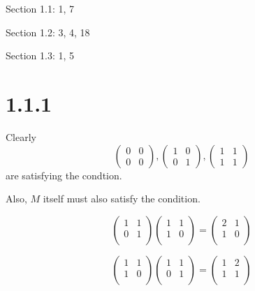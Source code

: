 \documentclass[11pt]{article}
\begin{document}


\begin{center}
\end{center}



Section 1.1: 1, 7

Section 1.2: 3, 4, 18

Section 1.3: 1, 5

\section*{1.1.1}

Clearly
$$
\begin{pmatrix} 
	0 & 0\\
	0 & 0 
\end{pmatrix},
\begin{pmatrix}
	1 & 0\\
	0 & 1
\end{pmatrix},
\begin{pmatrix}
	1 & 1\\
	1 & 1 
\end{pmatrix}  
$$
are satisfying the condtion.

Also, $M$ itself must also satisfy the condition.

$$
\begin{pmatrix}
	1 & 1 \\
	0 & 1 \\
\end{pmatrix}
\begin{pmatrix}
	1 & 1 \\
	1 & 0 \\
\end{pmatrix} = 
\begin{pmatrix}
	2 & 1 \\
	1 & 0 \\
\end{pmatrix}
$$

$$
\begin{pmatrix}
	1 & 1 \\
	1 & 0 \\
\end{pmatrix}
\begin{pmatrix}
	1 & 1 \\
	0 & 1 \\
\end{pmatrix} = 
\begin{pmatrix}
	1 & 2 \\
	1 & 1 \\
\end{pmatrix}
$$
\end{document}
